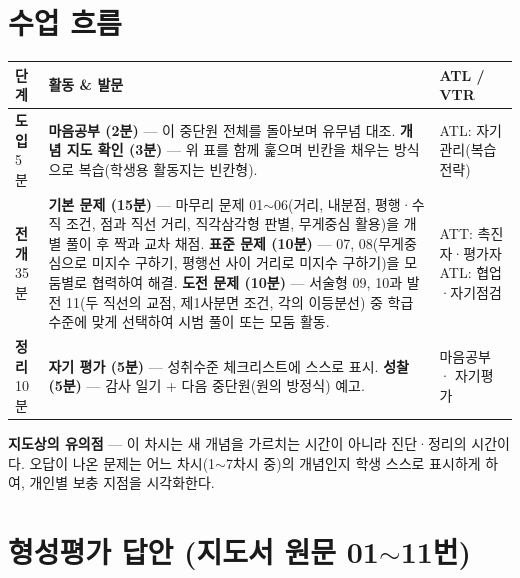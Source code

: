 \documentclass[11pt,a4paper]{article}
\begin{document}
\section{수업 흐름}

\begin{tabularx}{\linewidth}{@{}>{\centering\arraybackslash}p{1.6cm}X>{\raggedright\arraybackslash\small}p{3.1cm}@{}}
\toprule
\textbf{단계} & \textbf{활동 \& 발문} & \textbf{ATL / VTR} \\
\midrule
\textcolor{goldstrong}{\textbf{도입}}\newline\footnotesize 5분 &
\textbf{마음공부 (2분)} --- 이 중단원 전체를 돌아보며 유무념 대조.\newline
\textbf{개념 지도 확인 (3분)} --- 위 표를 함께 훑으며 빈칸을 채우는 방식으로 복습(학생용 활동지는 빈칸형). &
ATL: 자기관리(복습 전략) \\
\addlinespace
\textcolor{goldstrong}{\textbf{전개}}\newline\footnotesize 35분 &
\textbf{기본 문제 (15분)} --- 마무리 문제 01$\sim$06(거리, 내분점, 평행·수직 조건, 점과 직선 거리, 직각삼각형 판별, 무게중심 활용)을 개별 풀이 후 짝과 교차 채점.\newline
\textbf{표준 문제 (10분)} --- 07, 08(무게중심으로 미지수 구하기, 평행선 사이 거리로 미지수 구하기)을 모둠별로 협력하여 해결.\newline
\textbf{도전 문제 (10분)} --- 서술형 09, 10과 발전 11(두 직선의 교점, 제1사분면 조건, 각의 이등분선) 중 학급 수준에 맞게 선택하여 시범 풀이 또는 모둠 활동. &
ATT: 촉진자·평가자\newline ATL: 협업·자기점검 \\
\addlinespace
\textcolor{goldstrong}{\textbf{정리}}\newline\footnotesize 10분 &
\textbf{자기 평가 (5분)} --- 성취수준 체크리스트에 스스로 표시.\newline
\textbf{성찰 (5분)} --- 감사 일기 + 다음 중단원(원의 방정식) 예고. &
마음공부 · 자기평가 \\
\bottomrule
\end{tabularx}

\begin{calloutbox}
\textbf{지도상의 유의점} --- 이 차시는 새 개념을 가르치는 시간이 아니라 진단·정리의 시간이다. 오답이 나온 문제는 어느 차시(1$\sim$7차시 중)의 개념인지 학생 스스로 표시하게 하여, 개인별 보충 지점을 시각화한다.
\end{calloutbox}

\section{형성평가 답안 (지도서 원문 01$\sim$11번)}
\end{document}
